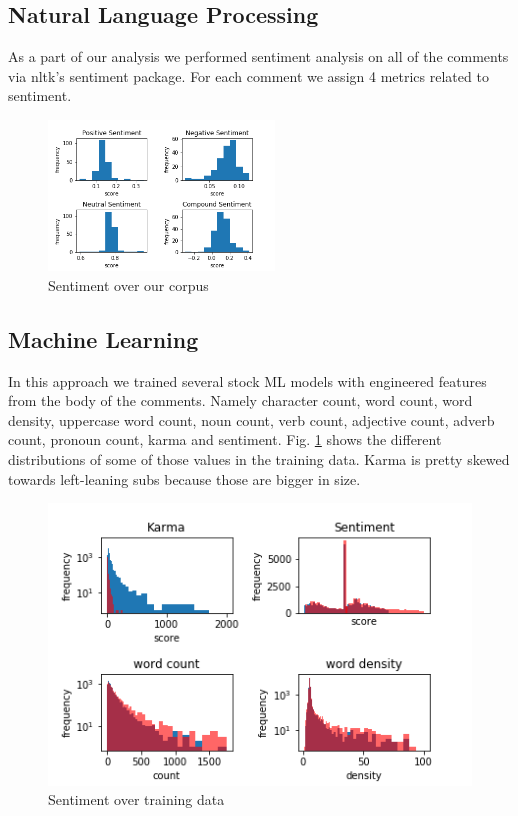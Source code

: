 \documentclass[11pt]{article}
\begin{document}
\subsection{Natural Language Processing}

As a part of our analysis we performed sentiment analysis on all of the comments via nltk's sentiment package. For each comment we assign 4 metrics related to sentiment.

\begin{figure}[h]
	\includegraphics[width=\columnwidth,height=4cm]{img/sent_dist_total.png}
	\caption{Sentiment over our corpus}
\end{figure}

\subsection{Machine Learning}

In this approach we trained several stock ML models with engineered features from the body of the comments. Namely character count, word count, word density, uppercase word count, noun count, verb count, adjective count, adverb count, pronoun count, karma and sentiment. Fig. \ref{features} shows the different distributions of some of those values in the training data. Karma is pretty skewed towards left-leaning subs because those are bigger in size.

\begin{figure}[h]
	\includegraphics[width=\columnwidth]{img/training_stats.png}
	\caption{\label{features}Sentiment over training data}
\end{figure}
\end{document}
